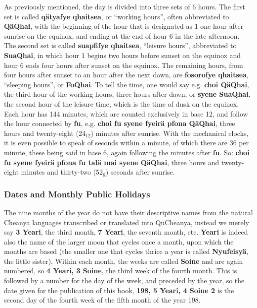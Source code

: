 \documentclass{article}
\begin{document}
As previously mentioned, the day is divided into three sets of 6 hours.  The first set is called \textbf{q\"atyafye qhaitsea}, or ``working hours'', often abbreviated to \textbf{Q\"aQhai}, with the beginning of the hour that is designated as 1 one hour after sunrise on the equinox, and ending at the end of hour 6 in the late afternoon.  The second set is called \textbf{suap\nobreak fifye qhaitsea}, ``leisure hours'', abbreviated to \textbf{SuaQhai}, in which hour 1 begins two hours before sunset on the equinox and hour 6 ends four hours after sunset on the equinox.  The remaining hours, from four hours after sunset to an hour after the next dawn, are \textbf{fosorofye qhaitsea}, ``sleeping hours'', or \textbf{FoQhai}.  To tell the time, one would say e.g. \textbf{choi Q\"aQhai}, the third hour of the working hours, three hours after dawn, or \textbf{syene SuaQhai}, the second hour of the leisure time, which is the time of dusk on the equinox.  Each hour has 144 minutes, which are counted exclusively in base 12, and follow the hour connected by \textbf{fu}, e.g. \textbf{choi fu syene fyeir\"a pfona Q\"aQhai}, three hours and twenty-eight (24$_{12}$) minutes after sunrise.  With the mechanical clocks, it is even possible to speak of seconds within a minute, of which there are 36 per minute, these being said in base 6, again following the minutes after \textbf{fu}.  So: \textbf{choi fu syene fyeir\"a pfona fu tal\"a mai syene Q\"aQhai}, three hours and twenty-eight minutes and thirty-two (52$_6$) seconds after sunrise.

\subsubsection{Dates and Monthly Public Holidays}

The nine months of the year do not have their descriptive names from the natural Cheanya languages transcribed or translated into QuCheanya, instead we merely say \textbf{3 Yeari}, the third month, \textbf{7 Yeari}, the seventh month, etc.  \textbf{Yeari} is indeed also the name of the larger moon that cycles once a month, upon which the months are based (the smaller one that cycles thrice a year is called \textbf{Nyufeisy\"a}, the little sister).  Within each month, the weeks are called \textbf{Soine} and are again numbered, so \textbf{4 Yeari, 3 Soine}, the third week of the fourth month.  This is followed by a number for the day of the week, and preceded by the year, so the date given for the publication of this book, \textbf{198, 5 Yeari, 4 Soine 2} is the second day of the fourth week of the fifth month of the year 198.
\end{document}
